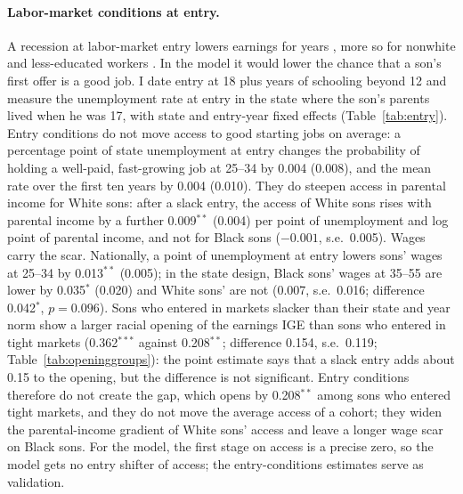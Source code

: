 \paragraph{Labor-market conditions at entry.} A recession at labor-market entry lowers earnings for years
\citep{kahn2010long, oreopoulos2012short}, more so for nonwhite and less-educated workers
\citep{schwandt2019unlucky}. In the model it would lower the chance that a son's first offer is a good job. I date entry
at 18 plus years of schooling beyond 12 and measure the unemployment rate at entry in the state where the son's parents
lived when he was 17, with state and entry-year fixed effects (Table~\ref{tab:entry}). Entry conditions do not move
access to good starting jobs on average: a percentage point of state unemployment at entry changes the probability of
holding a well-paid, fast-growing job at 25--34 by 0.004 (0.008), and the mean rate over the first ten years by 0.004
(0.010). They do steepen access in parental income for White sons: after a slack entry, the access of White sons rises
with parental income by a further 0.009$^{**}$ (0.004) per point of unemployment and log point of parental income, and
not for Black sons ($-0.001$, s.e.\ 0.005). Wages carry the scar. Nationally, a point of unemployment at entry lowers
sons' wages at 25--34 by 0.013$^{**}$ (0.005); in the state design, Black sons' wages at 35--55 are lower by
0.035$^{*}$ (0.020) and White sons' are not (0.007, s.e.\ 0.016; difference 0.042$^{*}$, $p=0.096$). Sons who entered in
markets slacker than their state and year norm show a larger racial opening of the earnings IGE than sons who entered in
tight markets (0.362$^{***}$ against 0.208$^{**}$; difference 0.154, s.e.\ 0.119; Table~\ref{tab:openinggroups}): the
point estimate says that a slack entry adds about 0.15 to the opening, but the difference is not significant.
Entry conditions therefore do not create the gap, which opens by 0.208$^{**}$ among sons who entered tight markets, and they
do not move the average access of a cohort; they widen the parental-income gradient of White sons' access and leave
a longer wage scar on Black sons. For the model, the first stage on access is a precise zero, so the model gets no
entry shifter of access; the entry-conditions estimates serve as validation.



